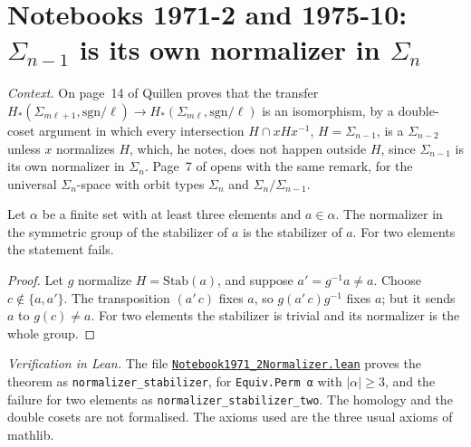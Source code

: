 \section[Notebooks 1971-2 and 1975-10: $\Sigma_{n-1}$ is self-normalizing]{Notebooks 1971-2 and 1975-10: $\Sigma_{n-1}$ is its own normalizer in $\Sigma_n$\protect{}}\label{sec:quillen-1971-2-normalizer}

\emph{Context.} On page~14 of  Quillen proves that the transfer $H_*(\Sigma_{m\ell+1}, \mathrm{sgn}/\ell) \to H_*(\Sigma_{m\ell}, \mathrm{sgn}/\ell)$ is an isomorphism, by a double-coset argument in which every intersection $H \cap xHx^{-1}$, $H = \Sigma_{n-1}$, is a $\Sigma_{n-2}$ unless $x$ normalizes $H$, which, he notes, does not happen outside $H$, since $\Sigma_{n-1}$ is its own normalizer in $\Sigma_n$. Page~7 of  opens with the same remark, for the universal $\Sigma_n$-space with orbit types $\Sigma_n$ and $\Sigma_n/\Sigma_{n-1}$.

\begin{encadre}
\begin{theoreme}\label{thm:quillen-1971-2-normalizer}
Let $\alpha$ be a finite set with at least three elements and $a \in \alpha$. The normalizer in the symmetric group of the stabilizer of $a$ is the stabilizer of $a$. For two elements the statement fails.
\end{theoreme}
\end{encadre}

\begin{proof}
Let $g$ normalize $H = \mathrm{Stab}(a)$, and suppose $a' = g^{-1}a \ne a$. Choose $c \notin \{a, a'\}$. The transposition $(a'\,c)$ fixes $a$, so $g(a'\,c)g^{-1}$ fixes $a$; but it sends $a$ to $g(c) \ne a$. For two elements the stabilizer is trivial and its normalizer is the whole group.
\end{proof}

\emph{Verification in Lean.} The file \href{\leanblobmain/Notebook1971_2Normalizer.lean}{\texttt{Notebook1971\_2Normalizer.\allowbreak{}lean}} proves the theorem as \texttt{normalizer\_stabilizer}, for \texttt{Equiv.Perm α} with $|\alpha| \ge 3$, and the failure for two elements as \texttt{normalizer\_stabilizer\_two}. The homology and the double cosets are not formalised. The axioms used are the three usual axioms of mathlib.

